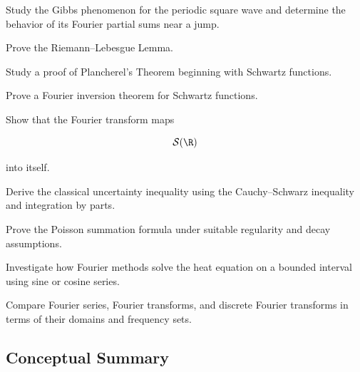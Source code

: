 \begin{exercise}[4]
Study the Gibbs phenomenon for the periodic square wave and determine the
behavior of its Fourier partial sums near a jump.
\end{exercise}

\begin{exercise}[4]
Prove the Riemann--Lebesgue Lemma.
\end{exercise}

\begin{exercise}[4]
Study a proof of Plancherel's Theorem beginning with Schwartz functions.
\end{exercise}

\begin{exercise}[4]
Prove a Fourier inversion theorem for Schwartz functions.
\end{exercise}

\begin{exercise}[4]
Show that the Fourier transform maps

\[
\mathcal{S}(\R)
\]

into itself.
\end{exercise}

\begin{exercise}[4]
Derive the classical uncertainty inequality using the Cauchy--Schwarz
inequality and integration by parts.
\end{exercise}

\begin{exercise}[4]
Prove the Poisson summation formula under suitable regularity and decay
assumptions.
\end{exercise}

\begin{exercise}[4]
Investigate how Fourier methods solve the heat equation on a bounded
interval using sine or cosine series.
\end{exercise}

\begin{exercise}[4]
Compare Fourier series, Fourier transforms, and discrete Fourier
transforms in terms of their domains and frequency sets.
\end{exercise}

\subsection{Conceptual Summary}
\label{subsec:fourier-analysis-summary}

